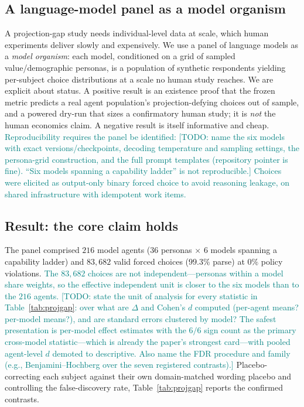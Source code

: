 \documentclass[journal]{IEEEtran}
\newcommand{\rev}[1]{\textcolor{teal}{#1}}
\begin{document}
\subsection{A language-model panel as a model organism}
A projection-gap study needs individual-level data at scale, which human experiments deliver slowly and expensively.
We use a panel of language models as a \emph{model organism}: each model, conditioned on a grid of sampled value/demographic personas, is a population of synthetic respondents yielding per-subject choice distributions at a scale no human study reaches.
We are explicit about status.
A positive result is an existence proof that the frozen metric predicts a real agent population's projection-defying choices out of sample, and a powered dry-run that sizes a confirmatory human study; it is \emph{not} the human economics claim.
A negative result is itself informative and cheap.
\rev{Reproducibility requires the panel be identified: [TODO: name the six models with exact versions/checkpoints, decoding temperature and sampling settings, the persona-grid construction, and the full prompt templates (repository pointer is fine). ``Six models spanning a capability ladder'' is not reproducible.] Choices were elicited as output-only binary forced choice to avoid reasoning leakage, on shared infrastructure with idempotent work items.}

\subsection{Result: the core claim holds}
The panel comprised $216$ model agents ($36$ personas $\times$ $6$ models spanning a capability ladder) and $83{,}682$ valid forced choices ($99.3\%$ parse) at $0\%$ policy violations.
\rev{The $83{,}682$ choices are not independent---personas within a model share weights, so the effective independent unit is closer to the six models than to the $216$ agents. [TODO: state the unit of analysis for every statistic in Table~\ref{tab:projgap}: over what are $\Delta$ and Cohen's $d$ computed (per-agent means? per-model means?), and are standard errors clustered by model? The safest presentation is per-model effect estimates with the $6/6$ sign count as the primary cross-model statistic---which is already the paper's strongest card---with pooled agent-level $d$ demoted to descriptive. Also name the FDR procedure and family (e.g., Benjamini--Hochberg over the seven registered contrasts).]}
Placebo-correcting each subject against their own domain-matched wording placebo and controlling the false-discovery rate, Table~\ref{tab:projgap} reports the confirmed contrasts.
\end{document}
